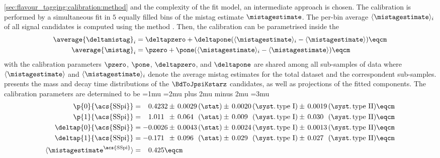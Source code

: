 \cref{sec:flavour_tagging:calibration:method} and the complexity of the fit model,
an intermediate approach is chosen. The calibration is performed by a
simultaneous fit in $\num{5}$ equally filled bins of the mistag estimate
$\mistagestimate$. The per-bin average $\langle\mistagestimate\rangle_i$ of all
signal candidates is computed using the \splot method \cite{Pivk:2004ty}. Then,
the calibration can be parametrised inside the \PDF
%
\begin{equation}
  \begin{split}
    \average{\deltamistag}_i  &= \deltapzero + \deltapone ( \langle\mistagestimate\rangle_i - \langle\mistagestimate\rangle )\eqcm \\
    \average{\mistag}_i       &= \pzero + \pone ( \langle\mistagestimate\rangle_i - \langle\mistagestimate\rangle )\eqcm
  \end{split}
\end{equation}
%
with the calibration parameters $\pzero$, $\pone$, $\deltapzero$, and
$\deltapone$ are shared among all sub-samples of data where
$\langle\mistagestimate\rangle$ and $\langle\mistagestimate\rangle_i$ denote the
average mistag estimates for the total dataset and the correspondent
sub-samples.  presents the mass and
decay time distributions of the $\BdToJpsiKstarz$ candidates, as well as
projections of the fitted \PDF components. The calibration parameters are
determined to be
%
\begingroup
  \thinmuskip=1mu
  \medmuskip=2mu plus 2mu minus 2mu
  \thickmuskip=3mu
\begin{equation*}\label{eq:flavour_tagging:calibration:ss:parameters}
  \begin{split}
    \p{0}{\text{\acs{SSpi}}}        &= \phantom{+}0.4232 \pm\, 
                                       0.0029 \text{\,(\stat)} \pm\, 
                                       0.0020 \text{\,(\syst.\,type I)} \pm\, 
                                       0.0019 \text{\,(\syst.\,type II)} \eqcm\\ %
    \p{1}{\text{\acs{SSpi}}}        &= \phantom{+}1.011\phantom{0} \pm\, 
                                       0.064\phantom{0} \text{\,(\stat)} \pm\, 
                                       0.009\phantom{0} \text{\,(\syst.\,type I)} \pm\, 
                                       0.030\phantom{0} \text{\,(\syst.\,type II)} \eqcm\\ %
    \deltap{0}{\text{\acs{SSpi}}} &= -0.0026 \pm\, 
                                      0.0043 \text{\,(\stat)} \pm\, 
                                      0.0024 \text{\,(\syst.\,type I)} \pm\, 
                                      0.0013 \text{\,(\syst.\,type II)} \eqcm \\
    \deltap{1}{\text{\acs{SSpi}}} &= -0.171\phantom{0} \pm\, 
                                      0.096\phantom{0} \text{\,(\stat)} \pm\, 
                                      0.029\phantom{0} \text{\,(\syst.\,type I)} \pm\, 
                                      0.027\phantom{0} \text{\,(\syst.\,type II)} \eqcm \\
    \langle\mistagestimate^{\text{\acs{SSpi}}}\rangle &= \phantom{+}0.425 \eqcm
  \end{split}
\end{equation*}
